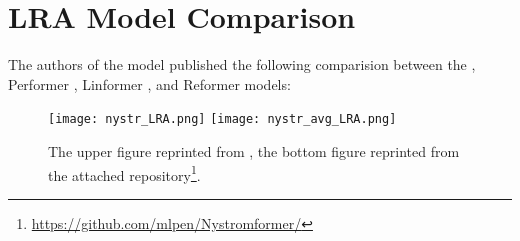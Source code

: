 \chapter*{LRA Model Comparison}

The authors of the \nystr{} model \citep{nystrom} published the following comparision between the \nystr{}, Performer \citep{performer}, Linformer \citep{linformer}, and Reformer \citep{reformer} models:

\begin{figure}[!htb]
    \centering
    \texttt{[image: nystr\_LRA.png]}
    \texttt{[image: nystr\_avg\_LRA.png]}
    \caption*{The upper figure reprinted from \citep{nystrom}, the bottom figure reprinted from the attached repository\footnote{\url{https://github.com/mlpen/Nystromformer/}}.}
\end{figure}